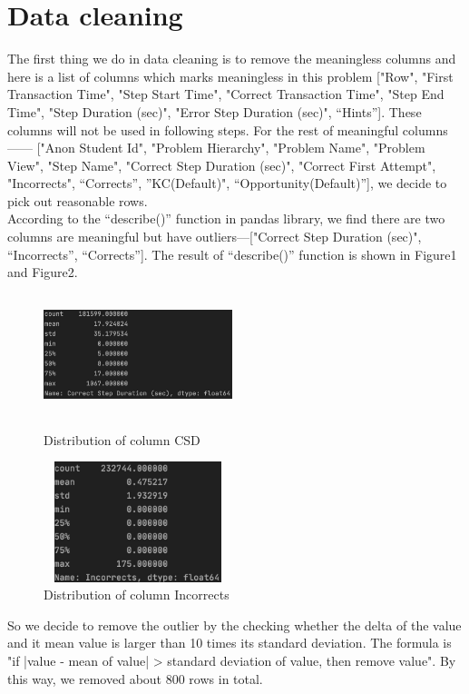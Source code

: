 \documentclass{article}
\begin{document}
\section{Data cleaning}
The first thing we do in data cleaning is to remove the meaningless columns and here is a list of columns which marks meaningless in this problem ["Row", "First Transaction Time", "Step Start Time", "Correct Transaction Time", "Step End Time", "Step Duration (sec)", "Error Step Duration (sec)", “Hints”]. These columns will not be used in following steps. For the rest of meaningful columns—— ["Anon Student Id", "Problem Hierarchy", "Problem Name", "Problem View", "Step Name", "Correct Step Duration (sec)", "Correct First Attempt", "Incorrects", “Corrects”, ”KC(Default)", “Opportunity(Default)”], we decide to pick out reasonable rows. \\
According to the “describe()” function in pandas library, we find there are two columns are meaningful but have outliers—["Correct Step Duration (sec)", “Incorrects”, “Corrects”]. The result of “describe()” function is shown in Figure1 and Figure2. 
\begin{figure}[h]
\begin{minipage}[t]{0.45\linewidth}
\centering
\includegraphics[width=5.5cm,height=3.5cm]{figure1.jpg}
\caption{Distribution of column CSD}
\end{minipage}
\begin{minipage}[t]{0.45\linewidth}        %
\hspace{2mm}
\includegraphics[width=5.5cm,height=3.5cm]{figure2.jpg}
\caption{Distribution of column Incorrects}
\end{minipage}
\end{figure}
So we decide to remove the outlier by the checking whether the delta of the value and it mean value is larger than 10 times its standard deviation. The formula is "if |value - mean of value| > standard deviation of value, then remove value". By this way, we removed about 800 rows in total.\\
\end{document}
